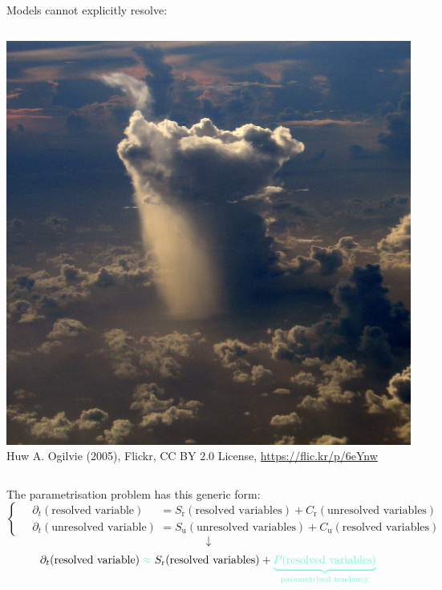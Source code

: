 \documentclass[12pt, aspectratio=169]{beamer}
\begin{document}
\begin{frame}{Models cannot explicitly resolve:}
\begin{columns}
\begin{column}{0.5\linewidth}
        \includegraphics[width=\linewidth]{figures/cloud.png}
        \color{gray} \tiny
        Huw A. Ogilvie (2005), Flickr, CC BY 2.0 License,
        \url{https://flic.kr/p/6eYnw}
    \end{column}
\end{columns}
\end{frame}

\begin{frame}{The parametrisation problem has this generic form:}
\begin{equation*}
    \left\{ \quad
    \begin{aligned}
        \partial_t (\text{resolved variable})
            &= S_\text{r}(\text{resolved variables})
            + C_\text{r}(\text{unresolved variables}) \\
        \partial_t (\text{unresolved variable})
            &= S_\text{u}(\text{unresolved variables})
            + C_\text{u}(\text{resolved variables})
    \end{aligned}
    \right.
\end{equation*}
{\Huge \[\downarrow\]}
\begin{equation*}
    \partial_t (\text{resolved variable})
        \begingroup \color{hilight} \approx \endgroup
        S_\text{r}(\text{resolved variables})
        + \begingroup \color{hilight}
            \underbrace{P(\text{resolved variables})}%
            _{\text{parametrised tendency}}
        \endgroup
\end{equation*}
\end{frame}
\end{document}
